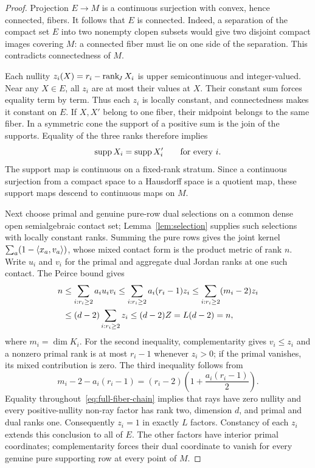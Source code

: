 \begin{proof}
Projection $E\to M$ is a continuous surjection with convex, hence
connected, fibers. It follows that $E$ is connected. Indeed, a separation
of the compact set $E$ into two nonempty clopen subsets would give two
disjoint compact images covering $M$: a connected fiber must lie on one
side of the separation. This contradicts connectedness of $M$.

Each nullity $z_i(X)=r_i-\operatorname{rank}_{\!J} X_i$ is upper semicontinuous and
integer-valued. Near any $X\in E$, all $z_i$ are at most their values at
$X$. Their constant sum forces equality term by term. Thus each $z_i$
is locally constant, and connectedness makes it constant on $E$.
If $X,X'$ belong to one fiber, their midpoint belongs to the same fiber.
In a symmetric cone the support of a positive sum is the join of the
supports. Equality of the three ranks therefore implies
\[
 \operatorname{supp} X_i=\operatorname{supp} X'_i\qquad\text{for every }i.
\]
The support map is continuous on a fixed-rank stratum. Since a continuous
surjection from a compact space to a Hausdorff space is a quotient map,
these support maps descend to continuous maps on $M$.

Next choose primal and genuine pure-row dual selections on a common
dense open semialgebraic contact set; Lemma~\ref{lem:selection} supplies
such selections with locally constant ranks. Summing the pure rows gives
the joint kernel $\sum_a(1-\langle x_a,v_a\rangle)$, whose mixed contact form is
the product metric of rank $n$. Write $u_i$ and $v_i$ for the primal and
aggregate dual Jordan ranks at one such contact. The Peirce bound gives
\begin{align}
 n&\leq\sum_{i:r_i\geq2}a_i u_i v_i
 \leq\sum_{i:r_i\geq2}a_i(r_i-1)z_i
 \leq\sum_{i:r_i\geq2}(m_i-2)z_i\notag\\
 &\leq(d-2)\sum_{i:r_i\geq2}z_i
 \leq(d-2)Z=L(d-2)=n,\label{eq:full-fiber-chain}
\end{align}
where $m_i=\dim K_i$. For the second inequality, complementarity gives
$v_i\leq z_i$ and a nonzero primal rank is at most $r_i-1$ whenever
$z_i>0$; if the primal vanishes, its mixed contribution is zero.
The third inequality follows from
\[
 m_i-2-a_i(r_i-1)
 =(r_i-2)\left(1+\frac{a_i(r_i-1)}2\right).
\]
Equality throughout~\eqref{eq:full-fiber-chain} implies that rays have
zero nullity and every positive-nullity non-ray factor has rank two,
dimension $d$, and primal and dual ranks one. Consequently $z_i=1$
in exactly $L$ factors. Constancy of each $z_i$ extends this conclusion
to all of $E$. The other factors have interior primal coordinates;
complementarity forces their dual coordinate to vanish for every genuine
pure supporting row at every point of $M$.


\end{proof}
